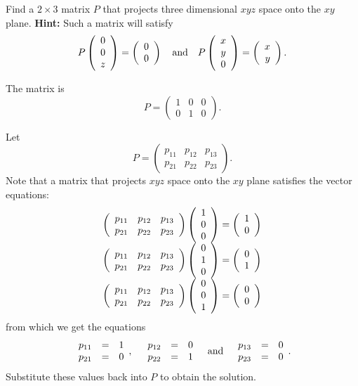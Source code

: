 \documentclass{ximera}
\begin{document}
\begin{exercise} \label{c4.2.3}
Find a $2\times 3$ matrix $P$ that projects three dimensional $xyz$ space onto
the $xy$ plane.  {\bf Hint:} Such a matrix will satisfy
\[
P\left(\begin{array}{c} 0 \\ 0 \\ z \end{array}\right) = \left(\begin{array}{r} 0 \\ 0\end{array}\right)
\quad\mbox{and}\quad
P\left(\begin{array}{c} x \\ y \\ 0 \end{array}\right) = \left(\begin{array}{r} x \\ y\end{array}\right).
\]

\begin{solution}

\ans The matrix is
\[ P = \left(\begin{array}{rrr} 1 & 0 & 0 \\ 0 & 1 & 0\end{array}\right). \]

\soln Let
\[ P = \left(\begin{array}{rrr} p_{11} & p_{12} & p_{13} \\
p_{21} & p_{22} & p_{23}\end{array}\right). \]
Note that a matrix that projects $xyz$ space onto the $xy$ plane
satisfies the vector equations:
\[ \begin{array}{c} \left(\begin{array}{rrr} p_{11} & p_{12} &
p_{13} \\ p_{21} & p_{22} & p_{23} \end{array}\right)
\left(\begin{array}{r} 1 \\ 0 \\ 0\end{array}\right) = \left(\begin{array}{r} 1 \\ 0\end{array}\right) \\
\left(\begin{array}{rrr} p_{11} & p_{12} & p_{13} \\ p_{21} &
p_{22} & p_{23} \end{array}\right) \left(\begin{array}{r} 0 \\ 1 \\ 0\end{array}\right) = \left(\begin{array}{r} 0 \\ 1\end{array}\right) \\
\left(\begin{array}{rrr} p_{11} & p_{12} & p_{13} \\ p_{21} & p_{22}
& p_{23} \end{array}\right) \left(\begin{array}{r} 0 \\ 0 \\ 1\end{array}\right) = \left(\begin{array}{r} 0 \\ 0\end{array}\right) \end{array} 
\]
from which we get the equations
\[ \begin{array}{rrrrrrr}
p_{11} & = & 1 \\
p_{21} & = & 0 \end{array},
\quad
\begin{array}{rrrrrrr}
p_{12} & = & 0 \\
p_{22} & = & 1 \end{array}
\quad\mbox{and}\quad
\begin{array}{rrrrrrr}
p_{13} & = & 0 \\
p_{23} & = & 0 \end{array}. 
\]
Substitute these values back into $P$ to obtain the solution.

\end{solution}
\end{exercise}
\end{document}
